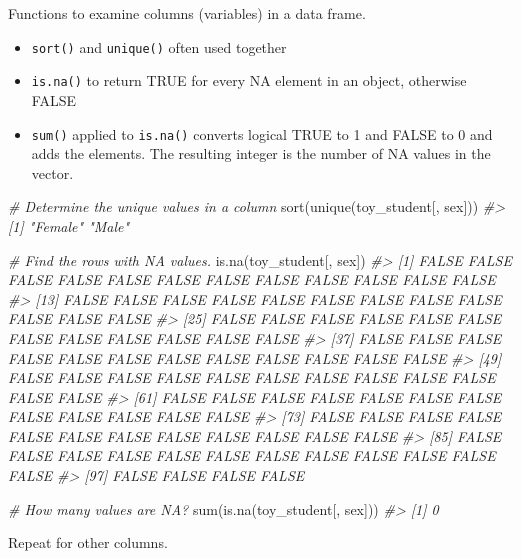 \documentclass[
]{book}
\newenvironment{Shaded}{\begin{snugshade}}{\end{snugshade}}
\newcommand{\CommentTok}[1]{\textcolor[rgb]{0.56,0.35,0.01}{\textit{#1}}}
\newcommand{\FunctionTok}[1]{\textcolor[rgb]{0.00,0.00,0.00}{#1}}
\newcommand{\NormalTok}[1]{#1}
\providecommand{\tightlist}{%
  \setlength{\itemsep}{0pt}\setlength{\parskip}{0pt}}
\begin{document}
Functions to examine columns (variables) in a data frame.

\begin{itemize}
\tightlist
\item
  \texttt{sort()} and \texttt{unique()} often used together
\item
  \texttt{is.na()} to return TRUE for every NA element in an object, otherwise FALSE
\item
  \texttt{sum()} applied to \texttt{is.na()} converts logical TRUE to 1 and FALSE to 0 and adds the elements. The resulting integer is the number of NA values in the vector.
\end{itemize}

\begin{Shaded}
\begin{Highlighting}[]
\CommentTok{\# Determine the unique values in a column }
\FunctionTok{sort}\NormalTok{(}\FunctionTok{unique}\NormalTok{(toy\_student[, sex]))}
\CommentTok{\#\textgreater{} [1] "Female" "Male"}

\CommentTok{\# Find the rows with NA values.}
\FunctionTok{is.na}\NormalTok{(toy\_student[, sex])}
\CommentTok{\#\textgreater{}   [1] FALSE FALSE FALSE FALSE FALSE FALSE FALSE FALSE FALSE FALSE FALSE FALSE}
\CommentTok{\#\textgreater{}  [13] FALSE FALSE FALSE FALSE FALSE FALSE FALSE FALSE FALSE FALSE FALSE FALSE}
\CommentTok{\#\textgreater{}  [25] FALSE FALSE FALSE FALSE FALSE FALSE FALSE FALSE FALSE FALSE FALSE FALSE}
\CommentTok{\#\textgreater{}  [37] FALSE FALSE FALSE FALSE FALSE FALSE FALSE FALSE FALSE FALSE FALSE FALSE}
\CommentTok{\#\textgreater{}  [49] FALSE FALSE FALSE FALSE FALSE FALSE FALSE FALSE FALSE FALSE FALSE FALSE}
\CommentTok{\#\textgreater{}  [61] FALSE FALSE FALSE FALSE FALSE FALSE FALSE FALSE FALSE FALSE FALSE FALSE}
\CommentTok{\#\textgreater{}  [73] FALSE FALSE FALSE FALSE FALSE FALSE FALSE FALSE FALSE FALSE FALSE FALSE}
\CommentTok{\#\textgreater{}  [85] FALSE FALSE FALSE FALSE FALSE FALSE FALSE FALSE FALSE FALSE FALSE FALSE}
\CommentTok{\#\textgreater{}  [97] FALSE FALSE FALSE FALSE}

\CommentTok{\# How many values are NA?}
\FunctionTok{sum}\NormalTok{(}\FunctionTok{is.na}\NormalTok{(toy\_student[, sex]))}
\CommentTok{\#\textgreater{} [1] 0}
\end{Highlighting}
\end{Shaded}

Repeat for other columns.
\end{document}
